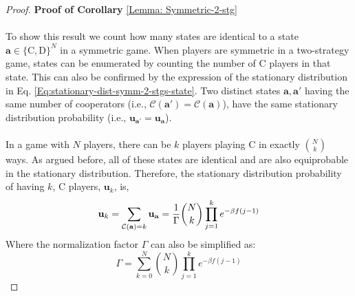 \documentclass[11pt]{article}
\theoremstyle{plainCl1}
\theoremstyle{plainCl2}
\newcommand{\abf}{\mathbf{a}}
\newcommand{\ubf}{\mathbf{u}}
\newcommand{\C}{\mathrm{C}}
\newcommand{\D}{\mathrm{D}}
\begin{document}
\begin{proof}
\textbf{Proof of Corollary} \ref{Lemma: Symmetric-2-stg} \\ \\
To show this result we count how many states are identical to a state $\abf \in \{\C,\D\}^N$ in a symmetric game. When players are symmetric in a two-strategy game, states can be enumerated by counting the number of $\C$ players in that state. This can also be confirmed by the expression of the stationary distribution in Eq. \ref{Eq:stationary-dist-symm-2-stgs-state}. Two distinct states $\abf, \abf'$ having the same number of cooperators (i.e., $\mathcal{C}(\abf') = \mathcal{C}(\abf)$), have the same stationary distribution probability (i.e., $\ubf_{\abf'} = \ubf_{\abf}$).
\\ \\ 
\noindent In a game with $N$ players, there can be $k$ players playing $\C$ in exactly $N \choose k$ ways. As argued before, all of these states are identical and are also equiprobable in the stationary distribution. Therefore, the stationary distribution probability of having $k$, $\C$ players, $\ubf_{k}$, is,
\begin{equation}
\ubf_{k} = \sum_{\mathcal{C(\abf)} = k} \ubf_\abf = \frac{1}{\Gamma} {N \choose k} \prod_{j=1}^k e^{-\beta f(j-1)} \\[10pt]
\end{equation} 
\noindent Where the normalization factor $\Gamma$ can also be simplified as: 
\begin{equation}
\Gamma = \sum_{k=0}^N {N \choose k} \prod_{j=1}^k e^{-\beta f(j-1)}
\end{equation}
\end{proof}
\newpage
\end{document}

